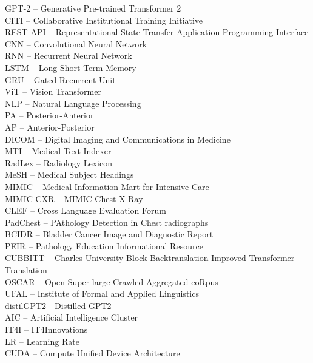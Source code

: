 \documentclass[12pt,a4paper]{report}
\begin{document}
\noindent GPT-2 -- Generative Pre-trained Transformer 2\\
CITI -- Collaborative Institutional Training Initiative\\
REST API -- Representational State Transfer Application Programming Interface\\
CNN -- Convolutional Neural Network\\
RNN -- Recurrent Neural Network\\
LSTM -- Long Short-Term Memory\\
GRU -- Gated Recurrent Unit\\
ViT -- Vision Transformer\\
NLP -- Natural Language Processing\\
PA -- Posterior-Anterior\\
AP -- Anterior-Posterior\\
DICOM -- Digital Imaging and Communications in Medicine\\
MTI -- Medical Text Indexer\\
RadLex -- Radiology Lexicon\\
MeSH -- Medical Subject Headings\\
MIMIC -- Medical Information Mart for Intensive Care\\
MIMIC-CXR -- MIMIC Chest X-Ray\\
CLEF -- Cross Language Evaluation Forum\\
PadChest -- PAthology Detection in Chest radiographs\\
BCIDR -- Bladder Cancer Image and Diagnostic Report\\
PEIR -- Pathology Education Informational Resource\\
CUBBITT -- Charles University Block-Backtranslation-Improved Transformer Translation\\
OSCAR -- Open Super-large Crawled Aggregated coRpus\\
UFAL -- Institute of Formal and Applied Linguistics\\
distilGPT2 - Distilled-GPT2\\
AIC -- Artificial Intelligence Cluster\\
IT4I -- IT4Innovations\\
LR -- Learning Rate\\
CUDA -- Compute Unified Device Architecture\\
\end{document}
